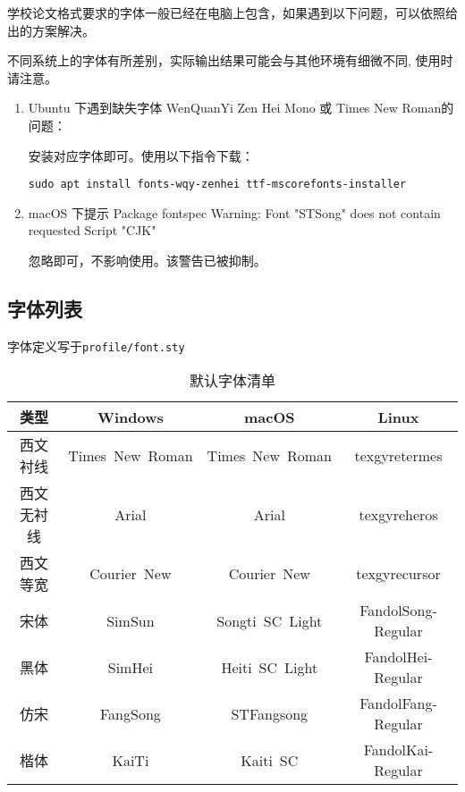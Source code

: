 学校论文格式要求的字体一般已经在电脑上包含，如果遇到以下问题，可以依照给出的方案解决。

不同系统上的字体有所差别，实际输出结果可能会与其他环境有细微不同, 使用时请注意。

\begin{enumerate}
    \item Ubuntu 下遇到缺失字体 WenQuanYi Zen Hei Mono 或 Times New Roman的问题：
    
       安装对应字体即可。使用以下指令下载：
       
       \begin{lstlisting}
sudo apt install fonts-wqy-zenhei ttf-mscorefonts-installer
        \end{lstlisting}

    \item macOS 下提示 Package fontspec Warning: Font "STSong" does not contain requested Script "CJK"

       忽略即可，不影响使用。该警告已被抑制。
\end{enumerate}

\subsection{字体列表}

字体定义写于\texttt{profile/font.sty}

\begin{table}[htbp]
    \caption{默认字体清单}
    \label{tab:fontset}
    \begin{tabular}{cccc}
        \toprule
        类型 & Windows & macOS & Linux \\
        \midrule
        西文衬线 & Times~New~Roman & Times~New~Roman & texgyretermes \\
        西文无衬线 & Arial & Arial & texgyreheros \\
        西文等宽 & Courier~New & Courier~New & texgyrecursor \\
        宋体 & SimSun & Songti~SC~Light &FandolSong-Regular \\
        黑体 & SimHei & Heiti~SC~Light & FandolHei-Regular \\
        仿宋 & FangSong & STFangsong & FandolFang-Regular \\
        楷体 & KaiTi & Kaiti~SC & FandolKai-Regular \\
        \bottomrule
    \end{tabular}
\end{table}